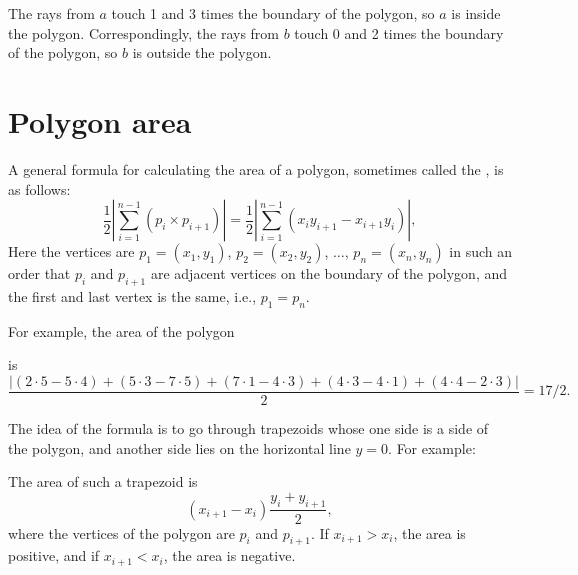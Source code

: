 The rays from $a$ touch 1 and 3 times
the boundary of the polygon,
so $a$ is inside the polygon.
Correspondingly, the rays from $b$
touch 0 and 2 times the boundary of the polygon,
so $b$ is outside the polygon.

\section{Polygon area}

A general formula for calculating the area
of a polygon, sometimes called the ,
is as follows: 
\[\frac{1}{2} |\sum_{i=1}^{n-1} (p_i \times p_{i+1})| =
    \frac{1}{2} |\sum_{i=1}^{n-1} (x_i y_{i+1} - x_{i+1} y_i)|, \]
Here the vertices are
$p_1=(x_1,y_1)$, $p_2=(x_2,y_2)$, $\ldots$, $p_n=(x_n,y_n)$
in such an order that
$p_i$ and $p_{i+1}$ are adjacent vertices on the boundary
of the polygon,
and the first and last vertex is the same, i.e., $p_1=p_n$.

For example, the area of the polygon
\begin{center}
\end{center}
is
\[\frac{|(2\cdot5-5\cdot4)+(5\cdot3-7\cdot5)+(7\cdot1-4\cdot3)+(4\cdot3-4\cdot1)+(4\cdot4-2\cdot3)|}{2} = 17/2.\]

The idea of the formula is to go through trapezoids
whose one side is a side of the polygon,
and another side lies on the horizontal line $y=0$.
For example:
\begin{center}
\end{center}
The area of such a trapezoid is
\[(x_{i+1}-x_{i}) \frac{y_i+y_{i+1}}{2},\]
where the vertices of the polygon are $p_i$ and $p_{i+1}$.
If $x_{i+1}>x_{i}$, the area is positive,
and if $x_{i+1}<x_{i}$, the area is negative.

